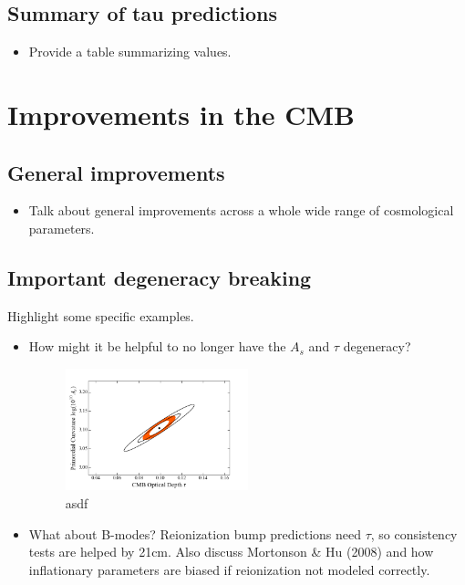\documentclass[twocolumn,aps,prd,nofootinbib,showpacs]{revtex4-1}
\begin{document}
\subsection{Summary of tau predictions}
\begin{itemize}
\item Provide a table summarizing values.
\end{itemize}

\section{Improvements in the CMB}
\subsection{General improvements}
\begin{itemize}
\item Talk about general improvements across a whole wide range of cosmological parameters.
\end{itemize}
\subsection{Important degeneracy breaking}
Highlight some specific examples.
\begin{itemize}
\item How might it be helpful to no longer have the $A_s$ and $\tau$ degeneracy?

\begin{figure}[!]
	\centering
	\includegraphics[width=0.5\textwidth]{figures/AsTauOnly_w21cm.png}
	\caption{asdf}
	\label{fig:AsTauOnly_w21cm}
\end{figure}

\item What about B-modes? Reionization bump predictions need $\tau$, so consistency tests are helped by 21cm. Also discuss Mortonson \& Hu (2008) and how inflationary parameters are biased if reionization not modeled correctly.
\end{itemize}
\end{document}

